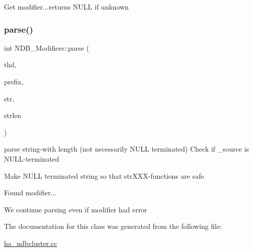 Get modifier...returns N\+U\+LL if unknown \mbox{\label{classNDB__Modifiers_a02f4af022d96e7bf5e25d79467bba423}} 
\subsubsection{\texorpdfstring{parse()}{parse()}}
{\footnotesize\ttfamily int N\+D\+B\+\_\+\+Modifiers\+::parse (\begin{DoxyParamCaption}\item[{T\+HD $\ast$}]{thd,  }\item[{const char $\ast$}]{prefix,  }\item[{const char $\ast$}]{str,  }\item[{size\+\_\+t}]{strlen }\end{DoxyParamCaption})}

parse string-\/with length (not necessarily N\+U\+LL terminated) Check if \+\_\+source is N\+U\+LL-\/terminated

Make N\+U\+LL terminated string so that str\+X\+XX-\/functions are safe

Found modifier...

We continue parsing even if modifier had error

The documentation for this class was generated from the following file\+:\begin{DoxyCompactItemize}
\item 
\mbox{\hyperlink{ha__ndbcluster_8cc}{ha\+\_\+ndbcluster.\+cc}}\end{DoxyCompactItemize}
